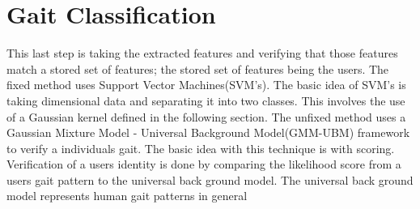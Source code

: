 \documentclass{sig-alternate}
\begin{document}
\section{Gait Classification}
	This last step is taking the extracted features and verifying that those features match a stored set of features; the stored set of features being the users. The fixed method uses Support Vector Machines(SVM's). The basic idea of SVM's is taking dimensional data and separating it into two classes. This involves the use of a Gaussian kernel defined in the following section. The unfixed method uses a Gaussian Mixture Model - Universal Background Model(GMM-UBM) framework to verify a individuals gait. The basic idea with this technique is with scoring. Verification of a users identity is done by comparing the likelihood score from a users gait pattern to the universal back ground model. The universal back ground model represents human gait patterns in general
\end{document}
